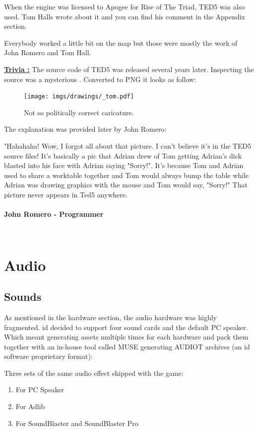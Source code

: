 \documentclass[book.tex]{subfiles}
\begin{document}
 When the engine was licensed to Apogee for Rise of The Triad, TED5 was also used. Tom Halls wrote about it and you can find his comment in the Appendix section.\\
\par
Everybody worked a little bit on the map but those were mostly the work of John Romero and Tom Hall.\\
\par
 \textbf{\underline{Trivia :}} The source code of TED5 was released several years later. Inspecting the source was a mysterious . Converted to PNG it looks as follow:\\
\begin{figure}[H]
\centering
 \texttt{[image: imgs/drawings/\_tom.pdf]}
 \caption{Not so politically correct caricature.} 
 \end{figure}
The explanation was provided later by John Romero:\\
 \begin{fancyquotes}
   "Hahahaha! Wow, I forgot all about that picture. I can't believe it's 
in the TED5 source files! It's basically a pic that Adrian drew of Tom 
getting Adrian's dick blasted into his face with Adrian saying "Sorry!". 
It's because Tom and Adrian used to share a worktable together and Tom 
would always bump the table while Adrian was drawing graphics with the 
mouse and Tom would say, "Sorry!" That picture never appears in Ted5 
anywhere.\\
   \\
\textbf{John Romero - Programmer}
 \end{fancyquotes}\\











\section{Audio}

\subsection{Sounds}
As mentioned in the hardware section, the audio hardware was highly fragmented. id decided to support four sound cards and the default PC speaker. Which meant generating assets multiple times for each hardware and pack them together with an in-house tool called MUSE generating AUDIOT archives (an id software proprietary format):\\
\begin{figure}[H]
\centering
 \end{figure}
 \par
 Three sets of the same audio effect shipped with the game:
\begin{enumerate}
\item For PC Speaker
\item For Adlib
\item For SoundBlaster and SoundBlaster Pro
\end{enumerate}
\end{document}
